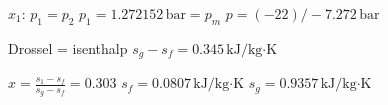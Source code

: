 \( x_1 \):  
\( p_1 = p_2 \)  
\( p_1 = 1.272152 \, \text{bar} = p_m \)  
\( p = (-22) / -7.272 \, \text{bar} \)  

Drossel = isenthalp  
\( s_g - s_f = 0.345 \, \text{kJ/kg·K} \)  

\( x = \frac{s_1 - s_f}{s_g - s_f} = 0.303 \)  
\( s_f = 0.0807 \, \text{kJ/kg·K} \)  
\( s_g = 0.9357 \, \text{kJ/kg·K} \)